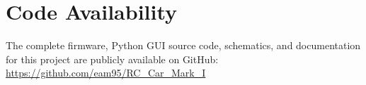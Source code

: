 \documentclass[conference]{IEEEtran}
\begin{document}
	\section*{Code Availability}
	
	The complete firmware, Python GUI source code, schematics, and documentation 
	for this project are publicly available on GitHub:
	\url{https://github.com/eam95/RC_Car_Mark_I}
	
	\bigskip
	
\end{document}
